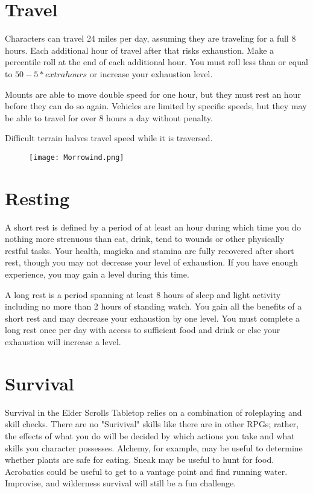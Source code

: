 \section{Travel}
Characters can travel 24 miles per day, assuming they are traveling for a full 8 hours. Each additional hour of travel after that risks exhaustion. Make a percentile roll at the end of each additional hour. You must roll less than or equal to $50-5*extra hours$ or increase your exhaustion level.

Mounts are able to move double speed for one hour, but they must rest an hour before they can do so again. Vehicles are limited by specific speeds, but they may be able to travel for over 8 hours a day without penalty.

Difficult terrain halves travel speed while it is traversed.

\begin{figure}[H]
	\texttt{[image: Morrowind.png]}
\end{figure}

\section{Resting}
A short rest is defined by a period of at least an hour during which time you do nothing more strenuous than eat, drink, tend to wounds or other physically restful tasks. Your health, magicka and stamina are fully recovered after short rest, though you may not decrease your level of exhaustion. If you have enough experience, you may gain a level during this time.

A long rest is a period spanning at least 8 hours of sleep and light activity including no more than 2 hours of standing watch. You gain all the benefits of a short rest and may decrease your exhaustion by one level. You must complete a long rest once per day with access to sufficient food and drink or else your exhaustion will increase a level.

\section{Survival}
Survival in the Elder Scrolls Tabletop relies on a combination of roleplaying and skill checks. There are no "Surivival" skills like there are in other RPGs; rather, the effects of what you do will be decided by which actions you take and what skills you character possesses. Alchemy, for example, may be useful to determine whether plants are safe for eating. Sneak may be useful to hunt for food. Acrobatics could be useful to get to a vantage point and find running water. Improvise, and wilderness survival will still be a fun challenge.

